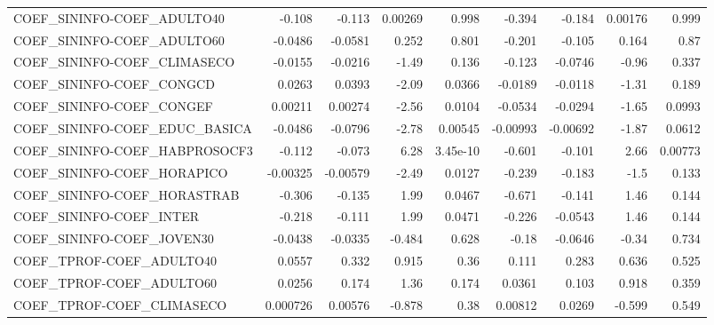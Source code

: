 \begin{tabular}{lrrrrrrrr}
COEF\_SININFO-COEF\_ADULTO40           &      -0.108 &       -0.113 & 0.00269 &    0.998 &     -0.394 &      -0.184 &      0.00176 &         0.999 \\
COEF\_SININFO-COEF\_ADULTO60           &     -0.0486 &      -0.0581 &   0.252 &    0.801 &     -0.201 &      -0.105 &        0.164 &          0.87 \\
COEF\_SININFO-COEF\_CLIMASECO          &     -0.0155 &      -0.0216 &   -1.49 &    0.136 &     -0.123 &     -0.0746 &        -0.96 &         0.337 \\
COEF\_SININFO-COEF\_CONGCD             &      0.0263 &       0.0393 &   -2.09 &   0.0366 &    -0.0189 &     -0.0118 &        -1.31 &         0.189 \\
COEF\_SININFO-COEF\_CONGEF             &     0.00211 &      0.00274 &   -2.56 &   0.0104 &    -0.0534 &     -0.0294 &        -1.65 &        0.0993 \\
COEF\_SININFO-COEF\_EDUC\_BASICA        &     -0.0486 &      -0.0796 &   -2.78 &  0.00545 &   -0.00993 &    -0.00692 &        -1.87 &        0.0612 \\
COEF\_SININFO-COEF\_HABPROSOCF3        &      -0.112 &       -0.073 &    6.28 & 3.45e-10 &     -0.601 &      -0.101 &         2.66 &       0.00773 \\
COEF\_SININFO-COEF\_HORAPICO           &    -0.00325 &     -0.00579 &   -2.49 &   0.0127 &     -0.239 &      -0.183 &         -1.5 &         0.133 \\
COEF\_SININFO-COEF\_HORASTRAB          &      -0.306 &       -0.135 &    1.99 &   0.0467 &     -0.671 &      -0.141 &         1.46 &         0.144 \\
COEF\_SININFO-COEF\_INTER              &      -0.218 &       -0.111 &    1.99 &   0.0471 &     -0.226 &     -0.0543 &         1.46 &         0.144 \\
COEF\_SININFO-COEF\_JOVEN30            &     -0.0438 &      -0.0335 &  -0.484 &    0.628 &      -0.18 &     -0.0646 &        -0.34 &         0.734 \\
COEF\_TPROF-COEF\_ADULTO40             &      0.0557 &        0.332 &   0.915 &     0.36 &      0.111 &       0.283 &        0.636 &         0.525 \\
COEF\_TPROF-COEF\_ADULTO60             &      0.0256 &        0.174 &    1.36 &    0.174 &     0.0361 &       0.103 &        0.918 &         0.359 \\
COEF\_TPROF-COEF\_CLIMASECO            &    0.000726 &      0.00576 &  -0.878 &     0.38 &    0.00812 &      0.0269 &       -0.599 &         0.549 \\

\end{tabular}
